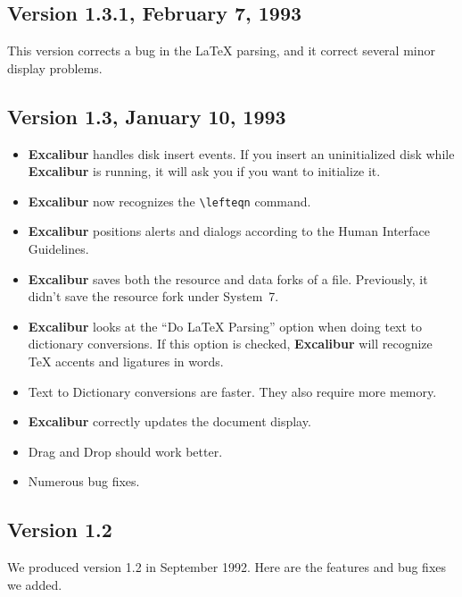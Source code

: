 \documentclass[11pt,titlepage]{article}
\newcommand{\ex}{\textbf{Excalibur}}
\begin{document}
\subsection{Version 1.3.1, February 7, 1993}

This version corrects a bug in the \LaTeX{} parsing, and it correct
several minor display problems.

\subsection{Version 1.3, January 10, 1993}

\begin{itemize}
\item \ex{} handles disk insert events. If you insert an uninitialized
  disk while \ex{} is running, it will ask you if you want to
  initialize it.

\item \ex{} now recognizes the \verb+\lefteqn+ command.

\item \ex{} positions alerts and dialogs according to the Human
  Interface Guidelines.

\item \ex{} saves both the resource and data forks of a file.
  Previously, it didn't save the resource fork under System~7.

\item \ex{} looks at the ``Do LaTeX Parsing'' option when doing text
  to dictionary conversions. If this option is checked, \ex{} will
  recognize \TeX{} accents and ligatures in words.

\item Text to Dictionary conversions are faster. They also require
  more memory.

\item \ex{} correctly updates the document display.

\item Drag and Drop should work better.

\item Numerous bug fixes.
\end{itemize}

\subsection{Version 1.2}

We produced version 1.2 in September 1992.  Here are the features and
bug fixes we added.
\end{document}

